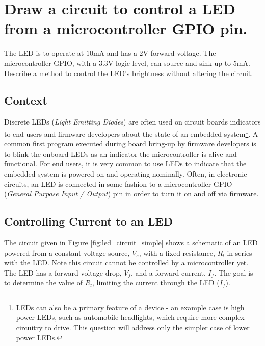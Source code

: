 \documentclass[main.tex]{subfiles}
\begin{document}
\section{Draw a circuit to control a LED from a microcontroller GPIO pin.} \label{section:led} 

The LED is to operate at $10\text{mA}$ and has a $2\text{V}$ forward voltage. The microcontroller GPIO, with a $3.3\text{V}$ logic level, can source and sink up to $5\text{mA}$. Describe a method to control the LED’s brightness without altering the circuit.

\spoilerline

\subsection{Context}
Discrete LEDs (\textit{Light Emitting Diodes}) are often used on circuit boards indicators to end users and firmware developers about the state of an embedded system\footnote{LEDs can also be a primary feature of a device - an example case is high power LEDs, such as automobile headlights, which require more complex circuitry to drive. This question will address only the simpler case of lower power LEDs.}. A common first program executed during board bring-up by firmware developers is to blink the onboard LEDs as an indicator the microcontroller is alive and functional. For end users, it is very common to use LEDs to indicate that the embedded system is powered on and operating nominally. Often, in electronic circuits, an LED is connected in some fashion to a microcontroller GPIO (\textit{General Purpose Input / Output}) pin in order to turn it on and off via firmware. 

\subsection{Controlling Current to an LED} 
\noindent The circuit given in Figure \ref{fig:led_circuit_simple} shows a schematic of an LED powered from a constant voltage source, $V_s$, with a fixed resistance, $R_l$ in series with the LED. Note this circuit cannot be controlled by a microcontroller yet. The LED has a forward voltage drop, $V_f$, and a forward current, $I_f$. The goal is to determine the value of $R_l$, limiting the current through the LED ($I_f$).
\end{document}
